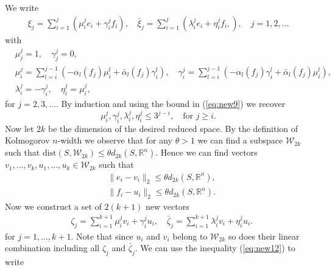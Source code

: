 We write
\begin{equation} \label{eq:new10}
\begin{aligned}
	\xi_j = \sum_{i=1}^j \left( \mu_i^j e_i + \gamma_i^j f_i \right), \quad \bar{\xi}_j = \sum_{i=1}^j \left( \lambda_i^j e_i + \eta_i^j f_i,  \right), \quad j=1,2,\dots
\end{aligned}
\end{equation}
with
\begin{equation} \label{eq:new11}
\begin{aligned}
	&\mu^j_j = 1, \quad \gamma^j_j = 0, \\
	&\mu_i^j = \sum_{l=i}^{j-1}\left( - \alpha_l(f_j) \mu_i^l  + \bar{\alpha}_l(f_j) \gamma_i^l \right), \quad\gamma_i^j = \sum_{l=i}^{j-1}\left( - \alpha_l(f_j) \gamma_i^l  + \bar{\alpha}_l(f_j) \mu_i^l \right), \\
	&\lambda^j_i = - \gamma ^j_i, \quad \eta^j_i = \mu^j_i,
\end{aligned}
\end{equation}
for $j=2,3,\dots$. By induction and using the bound in (\ref{eq:new9}) we recover
\begin{equation} \label{eq:new12}
	\mu^j_i,\gamma^j_i,\lambda^j_i,\eta^j_i \leq 3^{j-i}, \quad \text{for } j\geq i.
\end{equation}
Now let $2k$ be the dimension of the desired reduced space. By the definition of Kolmogorov $n$-width we observe that for any $\theta > 1$ we can find a subspace $\mathcal W_{2k}$ such that $\text{dist}(S,\mathcal W _{2k}) \leq \theta d_{2k}(S,\mathbb R^n)$. Hence we can find vectors $v_1,\dots,v_k,u_1,\dots,u_k\in \mathcal W_{2k}$ such that
\begin{equation} \label{eq:new13}
\begin{aligned}
	& \|e_i - v_i\|_2 \leq \theta d_{2k}(S,\mathbb R^n), \\
	& \|f_i - u_i\|_2 \leq \theta d_{2k}(S,\mathbb R^n).
\end{aligned}
\end{equation}
Now we construct a set of $2(k+1)$ new vectors
\begin{equation} \label{eq:new14}
\begin{aligned}
	& \zeta_j = \sum_{i=1}^{k+1} \mu_i^j v_i + \gamma^j_i u_i,\quad \bar{\zeta}_j = \sum_{i=1}^{k+1} \lambda_i^j v_i + \eta^j_i u_i.
\end{aligned}
\end{equation}
for $j = 1,\dots,k+1$. Note that since $u_i$ and $v_i$ belong to $\mathcal W_{2k}$ so does their linear combination including all $\zeta_j$ and $\bar{\zeta}_j$. We can use the inequality (\ref{eq:new12}) to write
